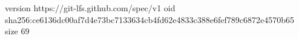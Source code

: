 version https://git-lfs.github.com/spec/v1
oid sha256:ce6136dc00af7d4e73bc7133634cb4fd62e4833c388e6fef789c6872e4570b65
size 69
